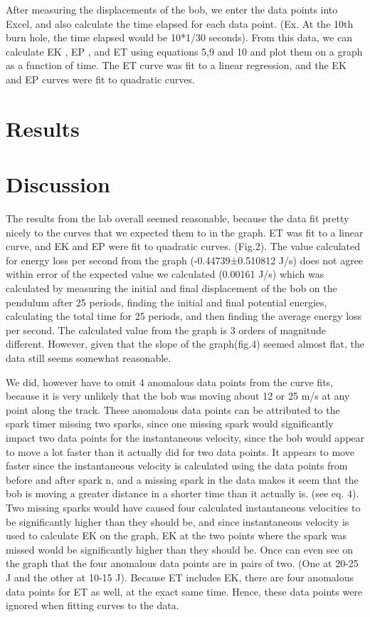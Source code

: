 \documentclass{article}
\begin{document}
After measuring the displacements of the bob, we enter the data points into Excel, and also calculate the time elapsed for each data point. (Ex. At the 10th burn hole, the time elapsed would be 10*1/30 seconds). From this data, we can calculate EK , EP , and ET  using equations  5,9 and 10 and plot them on a graph as a function of time. The ET curve was fit to a linear regression, and the EK and EP curves were fit to quadratic curves.

\section{Results}
  \lipsum[3]

\section{Discussion}
The results from the lab overall seemed reasonable, because the data fit pretty nicely to the curves that we expected them to in the graph. ET was fit to a linear curve, and EK and EP were fit to quadratic curves.  (Fig.2).  The value calculated for energy loss per second from the graph (-0.44739±0.510812 J/s) does not agree within error of the expected value we calculated (0.00161 J/s) which was calculated by measuring the initial and final displacement of the bob on the pendulum after 25 periods, finding the initial and final potential energies, calculating the total time for 25 periods, and then finding the average energy loss per second. The calculated value from the graph is 3 orders of magnitude different. However, given that the slope of the graph(fig.4) seemed almost flat, the data still seems somewhat reasonable.

We did, however have to omit 4 anomalous data points from the curve fits, because it is very unlikely that the bob was moving about 12 or 25 m/s at any point along the track. These anomalous data points can be attributed to the spark timer missing two sparks, since one missing spark would significantly impact two data points for the instantaneous velocity, since the bob would appear to move a lot faster than it actually did for two data points. It appears to move faster since the instantaneous velocity is calculated using the data points from before and after spark n, and a missing spark in the data makes it seem that the bob is moving a greater distance in a shorter time than it actually is. (see eq. 4). Two missing sparks would have caused four calculated instantaneous velocities to be significantly higher than they should be, and since instantaneous velocity is used to calculate EK on the graph, EK at the two points where the spark was missed would be significantly higher than they should be. Once can even see on the graph that the four anomalous data points are in pairs of two. (One at 20-25 J and the other at 10-15 J). Because ET includes EK, there are four anomalous data points for ET as well, at the exact same time.  Hence, these data points were ignored when fitting curves to the data.
\end{document}
